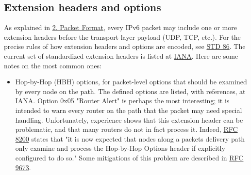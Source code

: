 \documentclass[
]{article}
\begin{document}
\subsection{Extension headers and
options}\label{extension-headers-and-options}

As explained in \hyperref[packet-format]{2. Packet Format}, every IPv6
packet may include one or more extension headers before the transport
layer payload (UDP, TCP, etc.). For the precise rules of how extension
headers and options are encoded, see
\href{https://www.rfc-editor.org/info/std86}{STD 86}. The current set of
standardized extension headers is listed at
\href{https://www.iana.org/assignments/ipv6-parameters/ipv6-parameters.xhtml\#extension-header}{IANA}.
Here are some notes on the most common ones:

\begin{itemize}
\item
  Hop-by-Hop (HBH) options, for packet-level options that should be
  examined by every node on the path. The defined options are listed,
  with references, at
  \href{https://www.iana.org/assignments/ipv6-parameters/ipv6-parameters.xhtml\#ipv6-parameters-2}{IANA}.
  Option 0x05 "Router Alert" is perhaps the most interesting; it is
  intended to warn every router on the path that the packet may need
  special handling. Unfortunately, experience shows that this extension
  header can be problematic, and that many routers do not in fact
  process it. Indeed, \href{https://www.rfc-editor.org/info/rfc8200}{RFC
  8200} states that "it is now expected that nodes along a
  packet\textquotesingle s delivery path only examine and process the
  Hop-by-Hop Options header if explicitly configured to do so." Some
  mitigations of this problem are described in
  \href{https://www.rfc-editor.org/info/rfc9673}{RFC 9673}.


\end{itemize}
\end{document}
